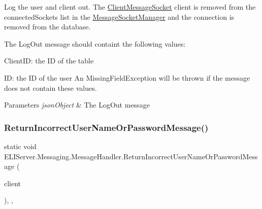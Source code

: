Log the user and client out. The \hyperlink{class_e_l_i_server_1_1_messaging_1_1_client_message_socket}{Client\+Message\+Socket} client is removed from the connected\+Sockets list in the \hyperlink{class_e_l_i_server_1_1_message_socket_manager}{Message\+Socket\+Manager} and the connection is removed from the database. 

The Log\+Out message should containt the following values\+:
\begin{DoxyItemize}
\item Client\+ID\+: the ID of the table
\item ID\+: the ID of the user An Missing\+Field\+Exception will be thrown if the message does not contain these values. 
\end{DoxyItemize}


\begin{DoxyParams}{Parameters}
{\em json\+Object} & The Log\+Out message\\
\hline
\end{DoxyParams}
\mbox{\label{class_e_l_i_server_1_1_messaging_1_1_message_handler_a9594cb08cdb01a3ae81e0e794447ff9c}} 
\subsubsection{\texorpdfstring{Return\+Incorrect\+User\+Name\+Or\+Password\+Message()}{ReturnIncorrectUserNameOrPasswordMessage()}}
{\footnotesize\ttfamily static void E\+L\+I\+Server.\+Messaging.\+Message\+Handler.\+Return\+Incorrect\+User\+Name\+Or\+Password\+Message (\begin{DoxyParamCaption}\item[{\hyperlink{class_e_l_i_server_1_1_messaging_1_1_client_message_socket}{Client\+Message\+Socket}}]{client }\end{DoxyParamCaption})\hspace{0.3cm}{\ttfamily [inline]}, {\ttfamily [static]}, {\ttfamily [private]}}



